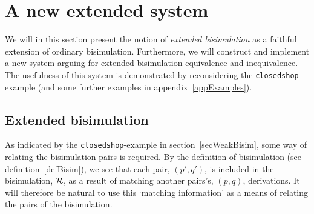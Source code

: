 
\chapter[A new extended system]{A new extended system}\label{chapExtended}

We will in this section present the notion of {\em extended bisimulation\/} as a faithful extension of ordinary bisimulation. Furthermore, we will construct and implement a new system arguing for extended bisimulation equivalence and inequivalence. The usefulness of this system is demonstrated by reconsidering the \verb#closedshop#-example (and some further examples in appendix~\ref{appExamples}).

\section{Extended bisimulation}
As indicated by the \verb#closedshop#-example in section~\ref{secWeakBisim}, some way of relating the bisimulation pairs is required. By the definition of bisimulation (see definition~\ref{defBisim}), we see that each pair, $(p',q')$, is included in the bisimulation, $\cal R$, as a result of matching another pairs's, $(p,q)$, derivations. It will therefore be natural to use this `matching information' as a means of relating the pairs of the bisimulation.

